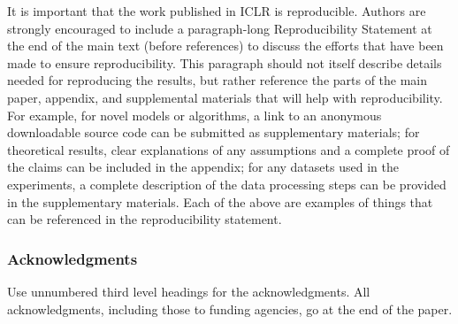 It is important that the work published in ICLR is reproducible. Authors are
strongly encouraged to include a paragraph-long Reproducibility Statement at the
end of the main text (before references) to discuss the efforts that have been
made to ensure reproducibility. This paragraph should not itself describe
details needed for reproducing the results, but rather reference the parts of
the main paper, appendix, and supplemental materials that will help with
reproducibility. For example, for novel models or algorithms, a link to an
anonymous downloadable source code can be submitted as supplementary materials;
for theoretical results, clear explanations of any assumptions and a complete
proof of the claims can be included in the appendix; for any datasets used in
the experiments, a complete description of the data processing steps can be
provided in the supplementary materials. Each of the above are examples of
things that can be referenced in the reproducibility statement.


\subsubsection*{Acknowledgments}
Use unnumbered third level headings for the acknowledgments. All
acknowledgments, including those to funding agencies, go at the end of the paper.
